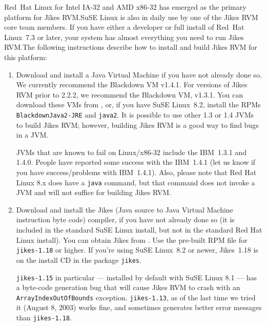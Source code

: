 Red~Hat\TMboth{} Linux\Rboth{} for Intel\Rboth{} IA-32 and AMD\Rboth{} x86-32 has emerged as the 
primary platform for Jikes\TMweb{} RVM.\@  SuSE\Rboth{} Linux is also in daily use
by one of the Jikes RVM core team members.
If you have either a developer or full install of Red~Hat
Linux~7.3 or later, your system has almost everything you need
to run Jikes RVM.\@  The following instructions describe how to install
and build Jikes RVM for this platform:
\begin{enumerate}

%
%
%
\item Download and install a Java\TMweb{} Virtual Machine if you have not
already done so.  We currently recommend the Blackdown VM v1.4.1. 
For versions of Jikes RVM prior to 2.2.2, we recommend
the Blackdown VM, v1.3.1.  You can download these VMs from 
\xlink{{\tt \BlackdownURL}}{\BlackdownURL}, or, if you have SuSE
Linux~8.2, install the RPMs {\tt Black\-downJa\-va2-JRE} and {\tt java2}. 
It is possible to use other 1.3 or 1.4 JVMs to build Jikes RVM;
however, building Jikes RVM is a good way to find bugs in a JVM.\@

%
JVMs that are known to fail on Linux/x86-32 include the IBM\Rweb{}~1.3.1 and
1.4.0.  People have reported some success with the IBM~1.4.1 (let us
know if you have success/problems with IBM~1.4.1). Also, please note
that Red Hat Linux 8.x does have a {\tt java} command, but that command does not invoke a
JVM and will not suffice for building Jikes RVM.\@

%
\item Download and install the Jikes (Java source to Java Virtual
  Machine instruction byte code)
compiler, if you have not already 
done so (it is included in the standard SuSE Linux install, but not in
the standard Red Hat Linux install).  You can 
obtain Jikes from .
Use the pre-built RPM file for {\tt jikes-1.18} or higher.   
If you're using SuSE Linux~8.2 or newer, Jikes~1.18 is on the install
CD in the package {\tt jikes}.


\begin{small}
{\tt jikes-1.15} in
particular --- installed by default with SuSE Linux 8.1 --- has a
byte-code generation bug that will cause Jikes RVM to crash with an
{\tt ArrayIndexOutOfBounds} exception.  {\tt jikes-1.13}, as of the last
time we tried it (August 8, 2003) works fine, and sometimes generates
better error messages than {\tt jikes-1.18}.
\end{small}


\end{enumerate}
